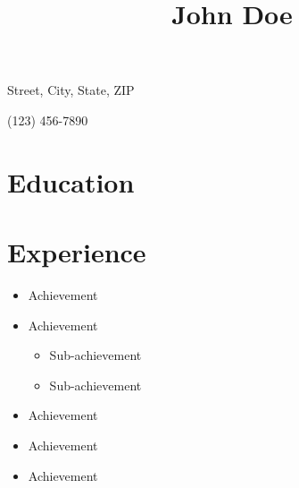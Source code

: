 \documentclass[11pt,letterpaper]{article}
\title{John Doe}
\begin{document}
\maketitle
\thispagestyle{empty}

\begin{personal}
  \item Street, City, State, ZIP
  \item (123) 456-7890  %
  \item {}
\end{personal}

\section{Education} %



\section{Experience} %

\lipsum[1][1-4]

\begin{itemize}
  \item Achievement

  \item Achievement
  \begin{itemize}
    \item Sub-achievement
    \item Sub-achievement
  \end{itemize}

  \item Achievement
\end{itemize}

\begin{itemize}
  \item Achievement
  \item Achievement
\end{itemize}
\end{document}
